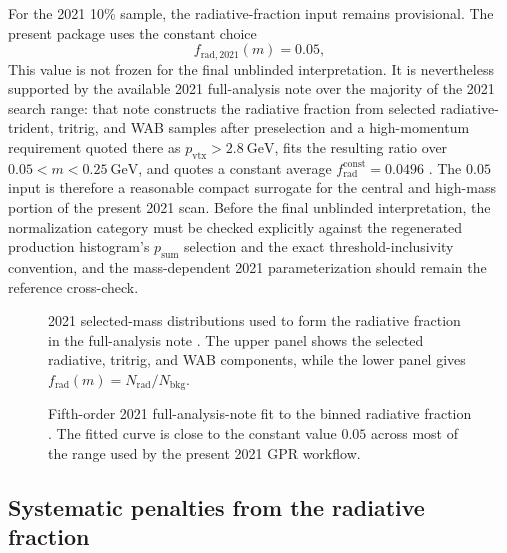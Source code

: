 For the 2021 10\% sample, the radiative-fraction input remains provisional. The
present package uses the constant choice
\begin{equation}
f_{\mathrm{rad},2021}(m) = 0.05,
\end{equation}
This value is not frozen for the final unblinded interpretation. It is nevertheless
supported by the available 2021 full-analysis note over the
majority of the 2021 search range: that note constructs the radiative fraction from
selected radiative-trident, tritrig, and WAB samples after preselection and a
high-momentum requirement quoted there as $p_{\mathrm{vtx}}>2.8~\mathrm{GeV}$, fits the resulting ratio over
$0.05<m<0.25~\mathrm{GeV}$, and quotes a constant average
$f_{\mathrm{rad}}^{\mathrm{const}}=0.0496$ \cite[Sec.~6.1, Figs.~92--93,
Eqs.~25--26]{HPS2021FullAnalysisNote}. The $0.05$ input is therefore a reasonable
compact surrogate for the central and high-mass portion of the present 2021 scan.
Before the final unblinded interpretation, the normalization category must be checked
explicitly against the regenerated production histogram's
$p_{\mathrm{sum}}$ selection and the exact threshold-inclusivity convention, and the
mass-dependent 2021 parameterization should remain the reference cross-check.

\begin{figure}[H]
\centering
{}
\caption{2021 selected-mass distributions used to form the radiative fraction in the
full-analysis note \cite{HPS2021FullAnalysisNote}. The upper panel shows the selected
radiative, tritrig, and WAB components, while the lower panel gives
$f_{\mathrm{rad}}(m)=N_{\mathrm{rad}}/N_{\mathrm{bkg}}$.}
\label{fig:2021-radfrac-note-components}
\end{figure}

\begin{figure}[H]
\centering
{}
\caption{Fifth-order 2021 full-analysis-note fit to the binned radiative fraction
\cite{HPS2021FullAnalysisNote}. The fitted curve is close to the constant value
$0.05$ across most of the range used by the present 2021 GPR workflow.}
\label{fig:2021-radfrac-note-fit}
\end{figure}

\subsection{Systematic penalties from the radiative fraction}
\label{sec:radfrac-penalty}

